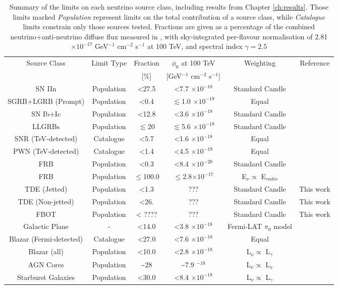 \begin{table*}[]
	\centering
	\begin{tabular}{|c c c c c c|} 
		\hline
		Source Class & Limit Type & Fraction & $\phi_{0}$ at 100 TeV & Weighting & Reference\\ 
		&&[\%]&[GeV$^{-1}$ cm$^{-2}$ s$^{-1}$]&&\\
		\hline
		SN IIn & Population & <27.5 & <7.7 $\times 10^{-18}$&Standard Candle&\cite{Stasik2018Search}\\
		SGRB+LGRB (Prompt) & Population & <0.4 &$\lesssim$1.0 $\times 10^{-19}$&Equal&\cite{ic_grb_17, maunu_thesis}\\
		SN Ib+Ic & Population & <12.8 &<3.6 $\times 10^{-18}$&Standard Candle&\cite{Stasik2018Search}\\
		LLGRBs & Population & $\lesssim$20 &$\lesssim$5.6 $\times 10^{-18}$&Standard Candle&\cite{Strotjohann2020Search}\\
		SNR (TeV-detected) & Catalogue & <5.7 & <1.6  $\times 10^{-18}$ & Equal & \cite{ic_17_galactic}\\
		PWN (TeV-detected) & Catalogue & <1.4 & <4.5 $\times 10^{-19}$ & Equal &  \cite{ic_20_pwn}\\
		FRB & Population & <0.3 & <8.4 $\times 10^{-20}$& Standard Candle & \cite{ic_fra}\\
		FRB & Population &  $\leq$100.0& $\leq$2.8$\times 10^{-17}$& E$_{\nu} \propto$ E$_{radio}$& \cite{ic_fra}\\
		TDE (Jetted) &Population& <1.3& ???&Standard Candle & This work\\
		TDE (Non-jetted) & Population &<26.& ???&Standard Candle & This work\\
		FBOT & Population & < ???? & ??? & Standard Candle & This work\\
		Galactic Plane & - & <14.0 &  <3.8 $\times 10^{-18}$  & Fermi-LAT $\pi_{0}$ model &\cite{ic_17_galactic}\\
		Blazar (Fermi-detected) & Catalogue & <27.0 & <7.6 $\times 10^{-18}$& Equal & \cite{ic_blazar_17}\\
		Blazar (all) & Population &<10.0&<2.8 $\times 10^{-18}$& L$_{\nu} \propto$ L$_{\gamma}$& \cite{ic_blazar_17}\\
		AGN Cores & Population &\sim28 &\sim 7.9 \times 10$^{-18}$& L$_{\nu} \propto$ L$_{x}$&\cite{federica_thesis}\\
		Starburst Galaxies & Population &<30.0& <8.4 $\times 10^{-18}$ & L$_{\nu} \propto$ L$_{\gamma}$&\cite{bechtol_sbg_17}\\
		\hline
	\end{tabular}
	\caption{Summary of the limits on each neutrino source class, including results from Chapter \ref{ch:results}. Those limits marked \emph{Population} represent limits on the total contribution of a source class, while \emph{Catalogue} limits constrain only those sources tested. Fractions are given as a percentage of the combined neutrino+anti-neutrino diffuse flux measured in \cite{ic_global_fit_15}, with sky-integrated per-flavour normalisation of 2.81 $\times 10^{-17}$ GeV$^{-1}$ cm$^{-2}$ s$^{-1}$ at 100 TeV, and spectral index $\gamma=2.5$}
	\label{tab:source_limits}
\end{table*}{}

